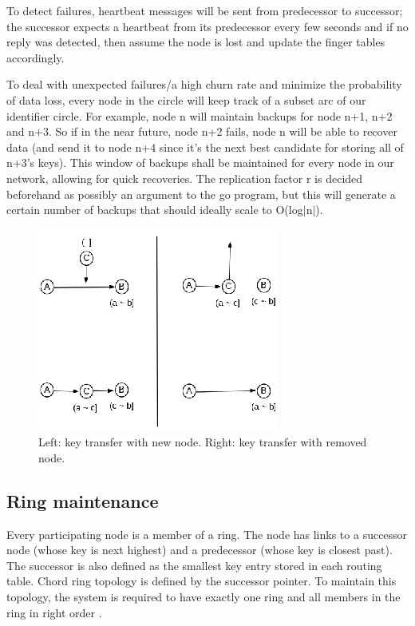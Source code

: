\documentclass[fleqn,24pt]{SelfArx} %
\begin{document}
To detect failures, heartbeat messages will be sent from predecessor to successor; the successor expects a heartbeat from its predecessor every few seconds and if no reply was detected, then assume the node is lost and update the finger tables accordingly.

To deal with unexpected failures/a high churn rate and minimize the probability of data loss, every node in the circle will keep track of a subset arc of our identifier circle. For example, node n will maintain backups for node n+1, n+2 and n+3. So if in the near future, node n+2 fails, node n will be able to recover data (and send it to node n+4 since it’s the next best candidate for storing all of n+3’s keys). This window of backups shall be maintained for every node in our network, allowing for quick recoveries. The replication factor r  is decided beforehand as possibly an argument to the go program, but this will generate a certain number of backups that should ideally scale to O(log$|$n$|$).

\begin{figure}[!htb]
\includegraphics{figure1.png}
\caption{\label{family} Left: key transfer with new node. Right: key transfer with removed node.
}
\label{22}
\end{figure}

\subsection{Ring maintenance}

Every participating node is a member of a ring. The node has links to a successor node (whose key is next highest) and a predecessor (whose key is closest past). The successor is also defined as the smallest key entry stored in each routing table. Chord ring topology is defined by the successor pointer. To maintain this topology, the system is required to have exactly one ring and all members in the ring in right order \cite{4}.
\end{document}
